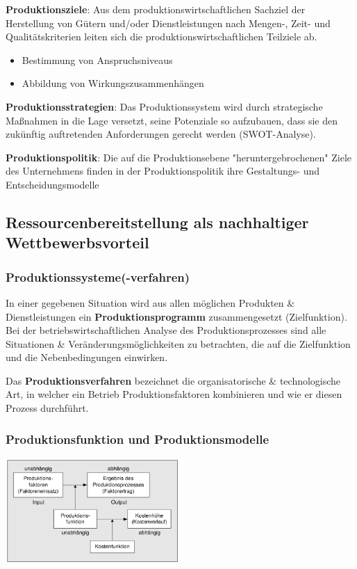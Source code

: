 \documentclass[11pt]{article}
\begin{document}
\begin{enumerate}
\textbf{\textbf{Produktionsziele}}:
Aus dem produktionswirtschaftlichen Sachziel der Herstellung von Gütern und/oder Dienstleistungen nach Mengen-, Zeit- und Qualitätskriterien leiten sich die
produktionswirtschaftlichen Teilziele ab.
\begin{itemize}
\item Bestimmung von Anspruchsniveaus
\item Abbildung von Wirkungszusammenhängen
\end{itemize}

\textbf{\textbf{Produktionsstrategien}}:
Das Produktionssystem wird durch strategische Maßnahmen in die Lage versetzt, seine Potenziale so aufzubauen, dass sie den zukünftig auftretenden Anforderungen gerecht werden (SWOT-Analyse).

\textbf{\textbf{Produktionspolitik}}:
Die auf die Produktionsebene "heruntergebrochenen" Ziele des Unternehmens finden in der Produktionspolitik ihre Gestaltungs- und Entscheidungsmodelle
\end{enumerate}
\subsection{Ressourcenbereitstellung als nachhaltiger Wettbewerbsvorteil}
\label{sec:org7969562}
\subsubsection{Produktionssysteme(-verfahren)}
\label{sec:orge2dcdb0}
In einer gegebenen Situation wird aus allen möglichen Produkten \& Dienstleistungen ein \textbf{Produktionsprogramm} zusammengesetzt (Zielfunktion). Bei der betriebswirtschaftlichen Analyse des Produktionsprozesses sind alle Situationen \& Veränderungsmöglichkeiten zu betrachten, die auf die Zielfunktion und die Nebenbedingungen einwirken.

Das \textbf{Produktionsverfahren} bezeichnet die organisatorische \& technologische Art, in welcher ein Betrieb Produktionsfaktoren kombinieren und wie er diesen Prozess durchführt.

\subsubsection{Produktionsfunktion und Produktionsmodelle}
\label{sec:org4650393}
\begin{center}
\includegraphics[width=250px]{./pictures/prodfunktion.png}
\end{center} 
\end{document}
